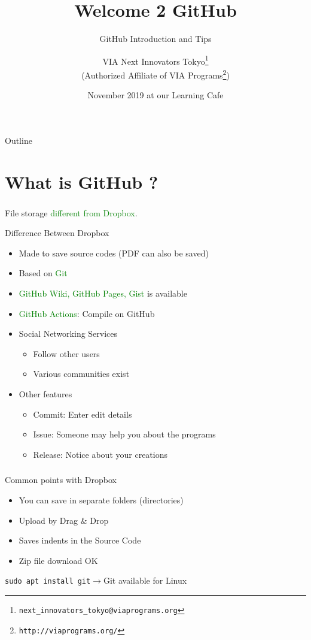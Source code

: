 \documentclass[dvipdfmx,10pt]{beamer}
\title{Welcome 2 GitHub}
\subtitle{GitHub Introduction and Tips}
\author[VIA Next Innovators Tokyo]{VIA Next Innovators Tokyo\footnote{\texttt{next\_innovators\_tokyo@viaprograms.org}}\\(Authorized Affiliate of VIA Programs\footnote{\texttt{http://viaprograms.org/}})}
\date[November 2019]{November 2019 at our Learning Cafe}
\newcommand{\bb}{\begin{block}}
\newcommand{\eb}{\end{block}}
\newcommand{\ft}{\frametitle}
\begin{document}
\begin{frame}
\titlepage
\end{frame}
\begin{frame}{Outline}
  \setcounter{tocdepth}{3}  
  \tableofcontents[
    sectionstyle=show,
    subsectionstyle=show/show,
    subsubsectionstyle=show/show/show
    ]
\end{frame}
\section{What is GitHub ?}
\begin{frame}\ft{\insertsection}
File storage \textcolor{green}{different from Dropbox}.
\begin{alertblock}{Difference Between Dropbox}
\begin{itemize}
\item Made to save source codes (PDF can also be saved)
\item Based on \textcolor{green}{Git}
\item \textcolor{green}{GitHub Wiki, GitHub Pages, Gist} is available
\item \textcolor{green}{GitHub Actions}: Compile on GitHub
\item Social Networking Services
\begin{itemize}
\item Follow other users 
\item Various communities exist
\end{itemize}
\item Other features
\begin{itemize}
\item Commit: Enter edit details
\item Issue: Someone may help you about the programs
\item Release: Notice about your creations
\end{itemize}
\end{itemize}
\end{alertblock}
\end{frame}
\begin{frame}\ft{\insertsection}
\begin{alertblock}{Common points with Dropbox}
\begin{itemize}
\item You can save in separate folders (directories)
\item Upload by Drag \& Drop
\item Saves indents in the Source Code
\item Zip file download OK
\end{itemize}
\end{alertblock}
\bb{}
\texttt{sudo apt install git}$\to$Git available for Linux
\eb
\end{frame}
\end{document}
